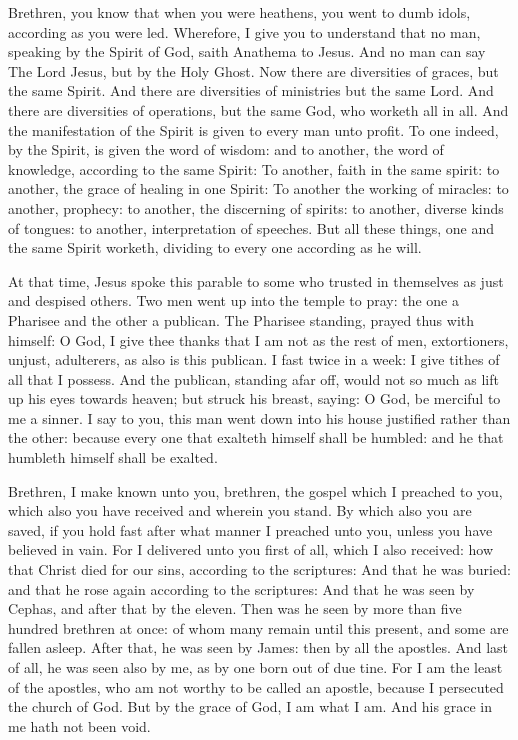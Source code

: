 \begin{multicols}{2}
Brethren, you know that when you were heathens, you went to dumb idols,
according as you were led.
Wherefore, I give you to understand that no man, speaking by the
Spirit of God, saith Anathema to Jesus. And no man can say The Lord
Jesus, but by the Holy Ghost.
Now there are diversities of graces, but the same Spirit.
And there are diversities of ministries but the same Lord.
And there are diversities of operations, but the same God, who
worketh all in all.
And the manifestation of the Spirit is given to every man unto
profit.
To one indeed, by the Spirit, is given the word of wisdom: and to
another, the word of knowledge, according to the same Spirit:
To another, faith in the same spirit: to another, the grace of
healing in one Spirit:
To another the working of miracles: to another, prophecy: to
another, the discerning of spirits: to another, diverse kinds of
tongues: to another, interpretation of speeches.
But all these things, one and the same Spirit worketh, dividing
to every one according as he will.



At that time, Jesus spoke this parable to some who trusted in themselves as just and despised others.
Two men went up into the temple to pray: the one a Pharisee and
the other a publican.
The Pharisee standing, prayed thus with himself: O God, I give
thee thanks that I am not as the rest of men, extortioners, unjust,
adulterers, as also is this publican.
I fast twice in a week: I give tithes of all that I possess.
And the publican, standing afar off, would not so much as lift up
his eyes towards heaven; but struck his breast, saying: O God, be
merciful to me a sinner.
I say to you, this man went down into his house justified rather
than the other: because every one that exalteth himself shall be
humbled: and he that humbleth himself shall be exalted.


\bigskip



Brethren, I make known unto you, brethren, the gospel which I preached
to you, which also you have received and wherein you stand.
By which also you are saved, if you hold fast after what manner I
preached unto you, unless you have believed in vain.
For I delivered unto you first of all, which I also received: how
that Christ died for our sins, according to the scriptures:
And that he was buried: and that he rose again according to the
scriptures:
And that he was seen by Cephas, and after that by the eleven.
Then was he seen by more than five hundred brethren at once: of
whom many remain until this present, and some are fallen asleep.
After that, he was seen by James: then by all the apostles.
And last of all, he was seen also by me, as by one born out of due
tine.
For I am the least of the apostles, who am not worthy to be called
an apostle, because I persecuted the church of God.
But by the grace of God, I am what I am. And his grace in me hath
not been void.%



\end{multicols}
